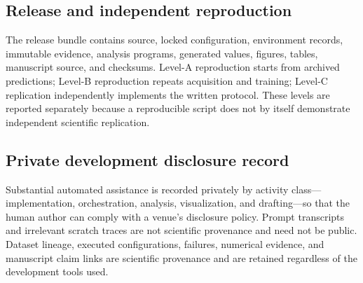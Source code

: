 \subsection{Release and independent reproduction}
The release bundle contains source, locked configuration, environment records, immutable
evidence, analysis programs, generated values, figures, tables, manuscript source, and
checksums.  Level-A reproduction starts from archived predictions; Level-B reproduction
repeats acquisition and training; Level-C replication independently implements the written
protocol.  These levels are reported separately because a reproducible script does not by
itself demonstrate independent scientific replication.

\subsection{Private development disclosure record}
Substantial automated assistance is recorded privately by activity class---implementation,
orchestration, analysis, visualization, and drafting---so that the human author can comply
with a venue's disclosure policy.  Prompt transcripts and irrelevant scratch traces are not
scientific provenance and need not be public.  Dataset lineage, executed configurations,
failures, numerical evidence, and manuscript claim links are scientific provenance and are
retained regardless of the development tools used.
